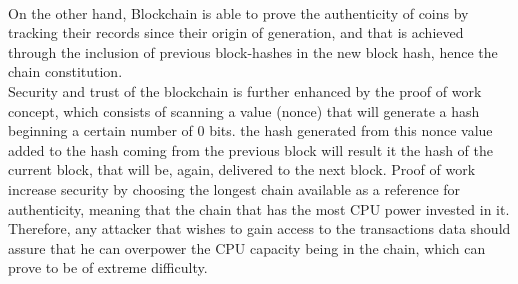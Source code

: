\\
On the other hand, Blockchain is able to prove the authenticity of coins by tracking their records since their origin of generation, and that is achieved through the inclusion of previous block-hashes in the new block hash, hence the chain constitution.\\
Security and trust of the blockchain is further enhanced by the proof of work concept, which consists of scanning a value (nonce) that will generate a hash beginning a certain number of 0 bits.  the hash generated from this nonce value added to the hash coming from the previous block will result it the hash of the current block, that will be, again, delivered to the next block. Proof of work increase security by choosing the longest chain available as a reference for authenticity, meaning that the chain that has the most CPU power invested in it. Therefore, any attacker that wishes to gain access to the transactions data should assure that he can overpower the CPU capacity being in the chain, which can prove to be of extreme difficulty.
\\
\\
\\
